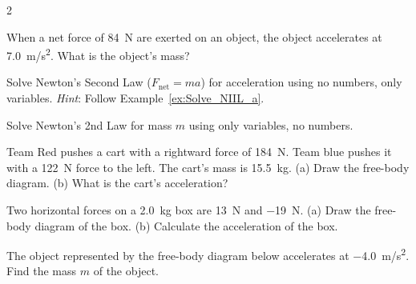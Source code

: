 \documentclass{article}
\numberwithin{equation}{section}
\numberwithin{figure}{section}
\begin{document}
\begin{multicols}{2}
\begin{exercise} \label{EAtsO8}
    When a net force of \SI{84}{N} are exerted on an object, the object accelerates at \SI{7.0}{m/s^2}. What is the object's mass?
\end{exercise}

\begin{exercise} \label{vuAqX8}
    Solve Newton's Second Law ($F_{\text{net}} = ma$) for acceleration using no numbers, only variables. \textit{Hint}: Follow Example~\ref{ex:Solve_NIIL_a}.
\end{exercise}

\begin{exercise} \label{zVvXad}
    Solve Newton's 2nd Law for mass $m$ using only variables, no numbers.
\end{exercise}

\begin{exercise} \label{XfTcUv}
Team Red pushes a cart with a rightward force of \SI{184}{N}. Team blue pushes it with a \SI{122}{N} force to the left. The cart's mass is \SI{15.5}{kg}. (a) Draw the free-body diagram. (b) What is the cart's acceleration?
\end{exercise}

\begin{exercise} \label{uawqLb}
    Two horizontal forces on a \SI{2.0}{kg} box are \SI{13}{N} and \SI{-19}{N}. (a) Draw the free-body diagram of the box. (b) Calculate the acceleration of the box. 
\end{exercise}

\begin{exercise} \label{FWDsH3}
The object represented by the free-body diagram below accelerates at \SI{-4.0}{m/s^2}. Find the mass $m$ of the object.
\end{exercise}

\begin{figure}[h!]
    \centering
{}
\end{figure}



\end{multicols}
\end{document}
